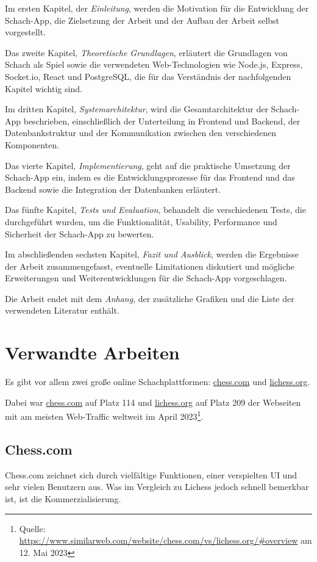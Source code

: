 Im ersten Kapitel, der \textit{Einleitung}, werden die Motivation für die Entwicklung der Schach-App, die Zielsetzung der Arbeit und der Aufbau der Arbeit selbst vorgestellt.

Das zweite Kapitel, \textit{Theoretische Grundlagen}, erläutert die Grundlagen von Schach als Spiel sowie die verwendeten Web-Technologien wie Node.js, Express, Socket.io, React und PostgreSQL, die für das Verständnis der nachfolgenden Kapitel wichtig sind.

Im dritten Kapitel, \textit{Systemarchitektur}, wird die Gesamtarchitektur der Schach-App beschrieben, einschließlich der Unterteilung in Frontend und Backend, der Datenbankstruktur und der Kommunikation zwischen den verschiedenen Komponenten.

Das vierte Kapitel, \textit{Implementierung}, geht auf die praktische Umsetzung der Schach-App ein, indem es die Entwicklungsprozesse für das Frontend und das Backend sowie die Integration der Datenbanken erläutert.

Das fünfte Kapitel, \textit{Tests und Evaluation}, behandelt die verschiedenen Tests, die durchgeführt wurden, um die Funktionalität, Usability, Performance und Sicherheit der Schach-App zu bewerten.

Im abschließenden sechsten Kapitel, \textit{Fazit und Ausblick}, werden die Ergebnisse der Arbeit zusammengefasst, eventuelle Limitationen diskutiert und mögliche Erweiterungen und Weiterentwicklungen für die Schach-App vorgeschlagen.

Die Arbeit endet mit dem \textit{Anhang}, der zusätzliche Grafiken und die Liste der verwendeten Literatur enthält.

\section{Verwandte Arbeiten}
\label{sec:Verwandte Arbeiten}
Es gibt vor allem zwei große online Schachplattformen: \url{chess.com} und \url{lichess.org}.

Dabei war \url{chess.com} auf Platz 114 und \url{lichess.org} auf Platz 209 der Webseiten mit am meisten Web-Traffic weltweit im April 2023\footnote{Quelle: \url{https://www.similarweb.com/website/chess.com/vs/lichess.org/\#overview} am 12. Mai 2023}.

\subsection{Chess.com}
Chess.com zeichnet sich durch vielfältige Funktionen, einer verspielten UI und sehr vielen Benutzern aus. Was im Vergleich zu Lichess jedoch schnell bemerkbar ist, ist die Kommerzialisierung.


